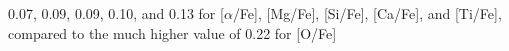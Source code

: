 0.07, 0.09, 0.09, 0.10, and 0.13 for [$\alpha$/Fe], [Mg/Fe], [Si/Fe], [Ca/Fe], and [Ti/Fe], compared to the much higher value of 0.22 for [O/Fe]%